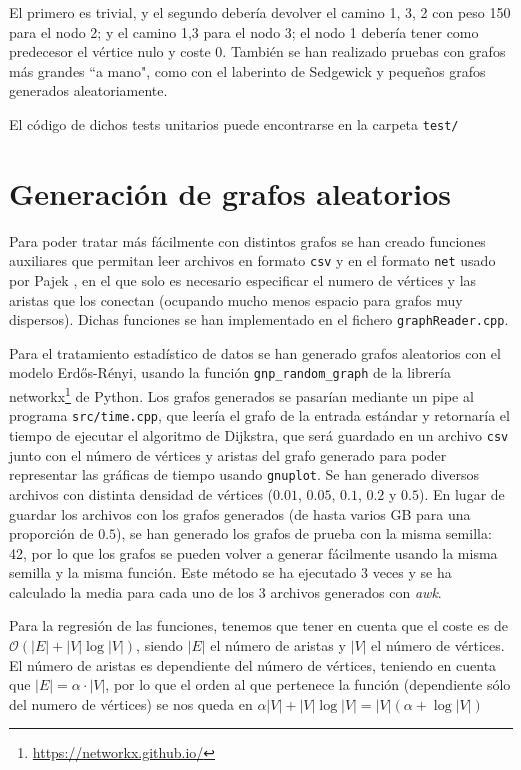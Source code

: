 \documentclass{article}
\begin{document}
El primero es trivial, y el segundo debería devolver el camino 1, 3, 2 con peso 150 para el nodo 2; y el camino 1,3 para el nodo 3; el nodo 1 debería tener como predecesor el vértice nulo y coste 0. También se han realizado pruebas con grafos más grandes ``a mano", como con el laberinto de Sedgewick \cite{SedgewickLabyrinth} y pequeños grafos generados aleatoriamente.

El código de dichos tests unitarios puede encontrarse en la carpeta \texttt{test/}

\section{Generación de grafos aleatorios}
Para poder tratar más fácilmente con distintos grafos se han creado funciones auxiliares que permitan leer archivos en formato \texttt{csv} y en el formato
\texttt{net}  usado por Pajek \cite{Pajek}, en el que solo es necesario especificar el numero de vértices y las aristas que los conectan (ocupando mucho menos espacio para grafos muy dispersos). Dichas funciones se han implementado en el fichero \texttt{graphReader.cpp}.

Para el tratamiento estadístico de datos se han generado grafos aleatorios con el modelo Erdős-Rényi, usando la función \texttt{gnp\_random\_graph} de la librería networkx\footnote{\url{https://networkx.github.io/}} de Python. Los grafos generados se pasarían mediante un pipe al programa \texttt{src/time.cpp}, que leería el grafo de la entrada estándar y retornaría el tiempo de ejecutar el algoritmo de Dijkstra, que será guardado en un archivo \texttt{csv} junto con el número de vértices y aristas del grafo generado para poder representar las gráficas de tiempo usando \texttt{gnuplot}. Se han generado diversos archivos con distinta densidad de vértices ($0.01$, $0.05$, $0.1$, $0.2$ y $0.5$). En lugar de guardar los archivos con los grafos generados (de hasta varios GB para una proporción de $0.5$), se han generado los grafos de prueba con la misma semilla: 42, por lo que los grafos se pueden volver a generar fácilmente usando la misma semilla y la misma función. Este método se ha ejecutado 3 veces y se ha calculado la media para cada uno de los 3 archivos generados con \textit{awk}.

Para la regresión de las funciones, tenemos que tener en cuenta que el coste es de $\mathcal{O}(|E| + |V|\log|V|)$, siendo $|E|$ el número de aristas y $|V|$ el número de vértices.  El número de aristas es dependiente del número de vértices, teniendo en cuenta que $|E| = \alpha\cdot|V|$, por lo que el orden al que pertenece la función (dependiente sólo del numero de vértices) se nos queda en
$\alpha|V| + |V|\log|V| = |V|\left(\alpha+\log|V|\right)$
\end{document}
